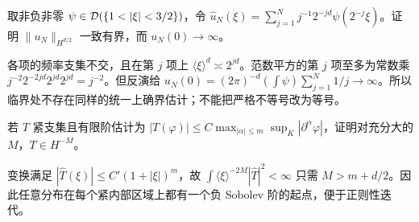 \begin{exercise}[临界指标不能由该估计补上]\label{ex:y6-critical}
取非负非零 $\psi\in\Test(\{1<|\xi|<3/2\})$，令 $\widehat u_N(\xi)=\sum_{j=1}^Nj^{-1}2^{-jd}\psi(2^{-j}\xi)$。证明 $\|u_N\|_{H^{d/2}}$ 一致有界，而 $u_N(0)\to\infty$。
\end{exercise}
\begin{solution}
各项的频率支集不交，且在第 $j$ 项上 $\langle\xi\rangle^d\asymp2^{jd}$。范数平方的第 $j$ 项至多为常数乘 $j^{-2}2^{-2jd}2^{jd}2^{jd}=j^{-2}$。但反演给 $u_N(0)=(2\pi)^{-d}(\int\psi)\sum_{j=1}^N1/j\to\infty$。所以临界处不存在同样的统一上确界估计；不能把严格不等号改为等号。
\end{solution}

\begin{exercise}[负阶起点]\label{ex:y6-negative-order}
若 $T$ 紧支集且有限阶估计为 $|T(\varphi)|\le C\max_{|\alpha|\le m}\sup_K|\partial^\alpha\varphi|$，证明对充分大的 $M$，$T\in H^{-M}$。
\end{exercise}
\begin{solution}
变换满足 $|\widehat T(\xi)|\le C'(1+|\xi|)^m$，故 $\int\langle\xi\rangle^{-2M}|\widehat T|^2<\infty$ 只需 $M>m+d/2$。因此任意分布在每个紧内部区域上都有一个负 Sobolev 阶的起点，便于正则性迭代。
\end{solution}

